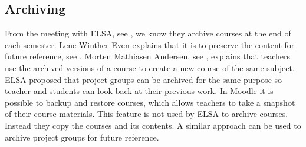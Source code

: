 \subsection{Archiving}
\label{sub:analysarchiving}
From the meeting with ELSA, see , we know they archive courses at the end of each semester. 
Lene Winther Even explains that it is to preserve the content for future reference, see . 
Morten Mathiasen Andersen, see , explains that teachers use the archived versions of a course to create a new course of the same subject. 
ELSA proposed that project groups can be archived for the same purpose so teacher and students can look back at their previous work.
In Moodle it is possible to backup and restore courses, which allows teachers to take a snapshot of their course materials. 
This feature is not used by ELSA to archive courses.
Instead they copy the courses and its contents.
A similar approach can be used to archive project groups for future reference. 